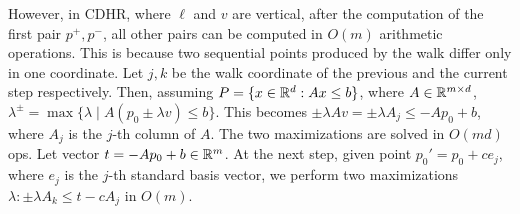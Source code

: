 \documentclass[11pt,a4paper]{article}
\begin{document}
However, in CDHR, where $\ell$ and $v$ are vertical,  
after the computation of the first pair ${p^+},{p^-}$, all
other pairs can be computed in $O(m)$ arithmetic operations.
This is because two sequential points produced by the walk
differ only in one coordinate.
Let $j,k$ be the walk coordinate of the previous and the current
step respectively.
Then, assuming $P=\{x\in{\mathbb R}^d: Ax\le b\}$, where $A\in{\mathbb R}^{m\times d}$,
$
\lambda^{\pm} = \max\{ \lambda\; |\; A ( p_0\pm\lambda v ) \le b \}.
$
This becomes $\pm \lambda Av = \pm \lambda A_{j} \le -Ap_0 + b $,
where $A_{j}$ is the $j$-th column of $A$.
The two maximizations are solved in $O(md)$ ops.
Let vector $t=-Ap_0 + b\in{\mathbb R}^m$.
At the next step, given point $p_0'=p_0+ce_{j}$, where $e_{j}$
is the $j$-th standard basis vector, we perform two maximizations
$\lambda : \pm \lambda A_{k} \le t - cA_{j}$ in $O(m)$.
\end{document}
